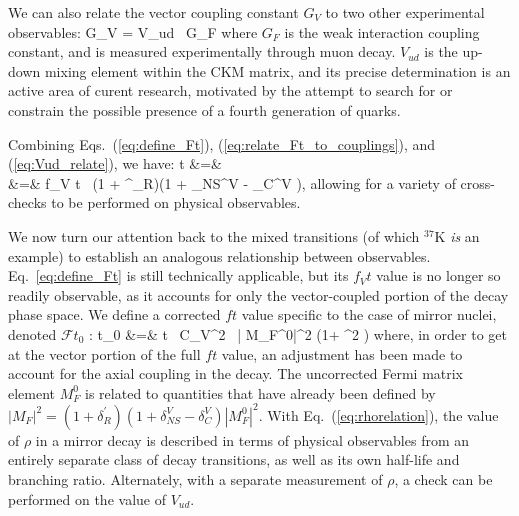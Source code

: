 We can also relate the vector coupling constant $G_V$ to two other experimental observables:
\bea
G_V = V_{ud}  \, G_F
\label{eq:Vud_relate}
\eea
where $G_F$ is the weak interaction coupling constant, and is measured experimentally through muon decay.  $V_{ud}$ is the up-down mixing element within the \ac{CKM} matrix, and its precise determination is an active area of curent research, motivated by the attempt to search for or constrain the possible presence of a fourth generation of quarks.

Combining Eqs.~(\ref{eq:define_Ft}), (\ref{eq:relate_Ft_to_couplings}), and (\ref{eq:Vud_relate}), we have:
\bea
{}t &=&  
\nonumber \\
&=& 
f_V t \, (1 + \delta^\prime_R)(1 + \delta_{NS}^V - \delta_C^{V} ), 
\label{eq:Ft_with_Vud}
\eea
allowing for a variety of cross-checks to be performed on physical observables.  

We now turn our attention back to the mixed transitions (of which $^{37}$K \emph{is} an example) to establish an analogous relationship between observables.  Eq.~\ref{eq:define_Ft} is still technically applicable, but its $f_Vt$ value is no longer so readily observable, as it accounts for only the vector-coupled portion of the decay phase space.  We define a corrected $ft$ value specific to the case of mirror nuclei, denoted $\mathcal{F}t_0$ 
\cite{shidling2014}
\cite{naviliat2009april}
\cite{ben_Abeta}:
\bea
{}t_0 &=&  t \, C_V^2 \, | M_F^0|^2 \left(1+ \rho^2 \right)
\label{eq:rhorelation}
\eea
where, in order to get at the vector portion of the full $ft$ value, an adjustment has been made to account for the axial coupling in the decay.  The uncorrected Fermi matrix element $M_F^0$ is related to quantities that have already been defined by $| M_F |^2 =  (1 + \delta^\prime_R)(1 + \delta_{NS}^V - \delta_C^{V} ) | M_F^0 |^2 $.  With Eq.~(\ref{eq:rhorelation}), the value of $\rho$ in a mirror decay is described in terms of physical observables from an entirely separate class of decay transitions, as well as its own half-life and branching ratio.  Alternately, with a separate measurement of $\rho$, a check can be performed on the value of $V_{ud}$.~


